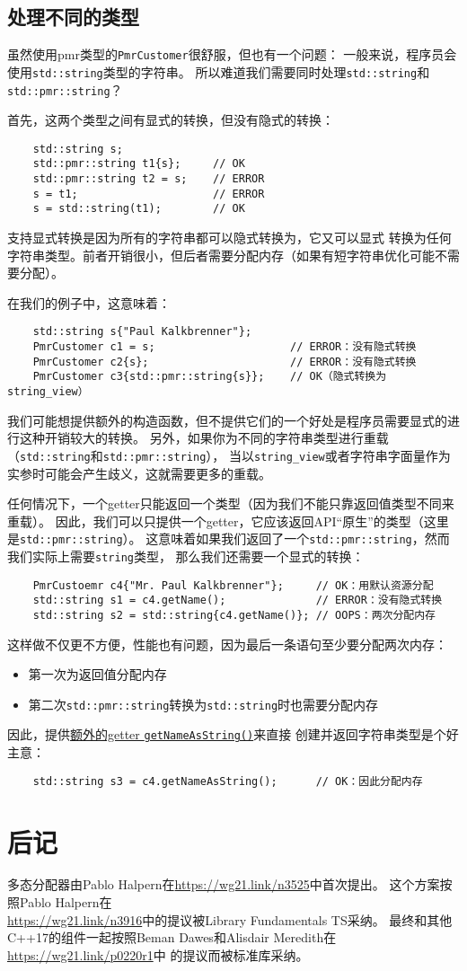\subsection{处理不同的类型}
虽然使用pmr类型的\texttt{PmrCustomer}很舒服，但也有一个问题：
一般来说，程序员会使用\texttt{std::string}类型的字符串。
所以难道我们需要同时处理\texttt{std::string}和\texttt{std::pmr::string}？

首先，这两个类型之间有显式的转换，但没有隐式的转换：
\begin{lstlisting}
    std::string s;
    std::pmr::string t1{s};     // OK
    std::pmr::string t2 = s;    // ERROR
    s = t1;                     // ERROR
    s = std::string(t1);        // OK
\end{lstlisting}
支持显式转换是因为所有的字符串都可以隐式转换为，它又可以显式
转换为任何字符串类型。前者开销很小，但后者需要分配内存（如果有短字符串优化可能不需要分配）。

在我们的例子中，这意味着：
\begin{lstlisting}
    std::string s{"Paul Kalkbrenner"};
    PmrCustomer c1 = s;                     // ERROR：没有隐式转换
    PmrCustomer c2{s};                      // ERROR：没有隐式转换
    PmrCustomer c3{std::pmr::string{s}};    // OK（隐式转换为string_view）
\end{lstlisting}
我们可能想提供额外的构造函数，但不提供它们的一个好处是程序员需要显式的进行这种开销较大的转换。
另外，如果你为不同的字符串类型进行重载（\texttt{std::string}和\texttt{std::pmr::string}），
当以\texttt{string\_view}或者字符串字面量作为实参时可能会产生歧义，这就需要更多的重载。

任何情况下，一个getter只能返回一个类型（因为我们不能只靠返回值类型不同来重载）。
因此，我们可以只提供一个getter，它应该返回API“原生”的类型（这里是\texttt{std::pmr::string}）。
这意味着如果我们返回了一个\texttt{std::pmr::string}，然而我们实际上需要\texttt{string}类型，
那么我们还需要一个显式的转换：\label{pmr转换}
\begin{lstlisting}
    PmrCustoemr c4{"Mr. Paul Kalkbrenner"};     // OK：用默认资源分配
    std::string s1 = c4.getName();              // ERROR：没有隐式转换
    std::string s2 = std::string{c4.getName()}; // OOPS：两次分配内存
\end{lstlisting}
这样做不仅更不方便，性能也有问题，因为最后一条语句至少要分配两次内存：
\begin{itemize}
    \item 第一次为返回值分配内存
    \item 第二次\texttt{std::pmr::string}转换为\texttt{std::string}时也需要分配内存
\end{itemize}
因此，提供\hyperref[ch29.3.1]{额外的getter \texttt{getNameAsString()}}来直接
创建并返回字符串类型是个好主意：
\begin{lstlisting}
    std::string s3 = c4.getNameAsString();      // OK：因此分配内存
\end{lstlisting}

\section{后记}
多态分配器由Pablo Halpern在\url{https://wg21.link/n3525}中首次提出。
这个方案按照Pablo Halpern在\\
\url{https://wg21.link/n3916}中的提议被Library Fundamentals TS采纳。
最终和其他C++17的组件一起按照Beman Dawes和Alisdair Meredith在\url{https://wg21.link/p0220r1}中
的提议而被标准库采纳。


